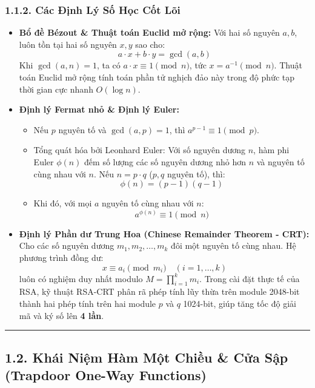 \documentclass[
]{article}
\providecommand{\tightlist}{%
  \setlength{\itemsep}{0pt}\setlength{\parskip}{0pt}}
\begin{document}
\subsubsection{1.1.2. Các Định Lý Số Học Cốt
Lõi}\label{cuxe1c-ux111ux1ecbnh-luxfd-sux1ed1-hux1ecdc-cux1ed1t-luxf5i}

\begin{itemize}
\item
  \textbf{Bổ đề Bézout \& Thuật toán Euclid mở rộng:} Với hai số nguyên
  \(a, b\), luôn tồn tại hai số nguyên \(x, y\) sao cho:
  \[a \cdot x + b \cdot y = \gcd(a, b)\] Khi \(\gcd(a, n) = 1\), ta có
  \(a \cdot x \equiv 1 \pmod n\), tức \(x = a^{-1} \pmod n\). Thuật toán
  Euclid mở rộng tính toán phần tử nghịch đảo này trong độ phức tạp thời
  gian cực nhanh \(O(\log n)\).
\item
  \textbf{Định lý Fermat nhỏ \& Định lý Euler:}

  \begin{itemize}
  \tightlist
  \item
    Nếu \(p\) nguyên tố và \(\gcd(a, p) = 1\), thì
    \(a^{p-1} \equiv 1 \pmod p\).
  \item
    Tổng quát hóa bởi Leonhard Euler: Với số nguyên dương \(n\), hàm phi
    Euler \(\phi(n)\) đếm số lượng các số nguyên dương nhỏ hơn \(n\) và
    nguyên tố cùng nhau với \(n\). Nếu \(n = p \cdot q\) (\(p, q\)
    nguyên tố), thì: \[\phi(n) = (p - 1)(q - 1)\]
  \item
    Khi đó, với mọi \(a\) nguyên tố cùng nhau với \(n\):
    \[a^{\phi(n)} \equiv 1 \pmod n\]
  \end{itemize}
\item
  \textbf{Định lý Phần dư Trung Hoa (Chinese Remainder Theorem - CRT):}
  Cho các số nguyên dương \(m_1, m_2, \dots, m_k\) đôi một nguyên tố
  cùng nhau. Hệ phương trình đồng dư:
  \[x \equiv a_i \pmod{m_i} \quad (i = 1, \dots, k)\] luôn có nghiệm duy
  nhất modulo \(M = \prod_{i=1}^k m_i\). Trong cài đặt thực tế của RSA,
  kỹ thuật RSA-CRT phân rã phép tính lũy thừa trên module 2048-bit thành
  hai phép tính trên hai module \(p\) và \(q\) 1024-bit, giúp tăng tốc
  độ giải mã và ký số lên \textbf{4 lần}.
\end{itemize}

\begin{center}\rule{0.5\linewidth}{0.5pt}\end{center}

\subsection{1.2. Khái Niệm Hàm Một Chiều \& Cửa Sập (Trapdoor One-Way
Functions)}\label{khuxe1i-niux1ec7m-huxe0m-mux1ed9t-chiux1ec1u-cux1eeda-sux1eadp-trapdoor-one-way-functions}
\end{document}
